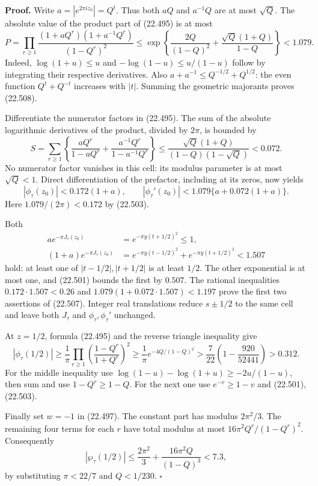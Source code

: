\documentclass[
  11pt,
  a4paper,
]{article}
\begin{document}
\textbf{Proof.} Write \(a=|e^{2\pi iz_0}|=Q^t\). Thus both \(aQ\) and
\(a^{-1}Q\) are at most \(\sqrt Q\). The absolute value of the product
part of (22.495) is at most \[
 P=\prod_{r\ge1}
 \frac{(1+aQ^r)(1+a^{-1}Q^r)}{(1-Q^r)^2}
 \le\exp\left\{\frac{2Q}{(1-Q)^2}
                 +\frac{\sqrt Q(1+Q)}{1-Q}\right\}<1.079.
 \tag{22.508}
\] Indeed, \(\log(1+u)\le u\) and \(-\log(1-u)\le u/(1-u)\) follow by
integrating their respective derivatives. Also
\(a+a^{-1}\le Q^{-1/2}+Q^{1/2}\): the even function \(Q^t+Q^{-t}\)
increases with \(|t|\). Summing the geometric majorants proves (22.508).

Differentiate the numerator factors in (22.495). The sum of the absolute
logarithmic derivatives of the product, divided by \(2\pi\), is bounded
by \[
 S=\sum_{r\ge1}\left\{
  \frac{aQ^r}{1-aQ^r}+\frac{a^{-1}Q^r}{1-a^{-1}Q^r}\right\}
 \le\frac{\sqrt Q(1+Q)}{(1-Q)(1-\sqrt Q)}<0.072.
 \tag{22.509}
\] No numerator factor vanishes in this cell: its modulus parameter is
at most \(\sqrt Q<1\). Direct differentiation of the prefactor,
including at its zeros, now yields \[
 |\phi_\tau(z_0)|<0.172(1+a),\qquad
 |\phi_\tau'(z_0)|<1.079\{a+0.072(1+a)\}.
 \tag{22.510}
\] Here \(1.079/(2\pi)<0.172\) by (22.503).

Both \[
 \begin{split}
 a e^{-\pi J_\tau(z_0)}&=e^{-\pi y(t+1/2)^2}\le1,\\
 (1+a)e^{-\pi J_\tau(z_0)}
 &=e^{-\pi y(t-1/2)^2}+e^{-\pi y(t+1/2)^2}<1.507
 \end{split}
 \tag{22.511}
\] hold: at least one of \(|t-1/2|,|t+1/2|\) is at least \(1/2\). The
other exponential is at most one, and (22.501) bounds the first by
\(0.507\). The rational inequalities \(0.172\cdot1.507<0.26\) and
\(1.079(1+0.072\cdot1.507)<1.197\) prove the first two assertions of
(22.507). Integer real translations reduce \(s\pm1/2\) to the same cell
and leave both \(J_\tau\) and \(\phi_\tau,\phi_\tau'\) unchanged.

At \(z=1/2\), formula (22.495) and the reverse triangle inequality give
\[
 |\phi_\tau(1/2)|\ge\frac1\pi
  \prod_{r\ge1}\left(\frac{1-Q^r}{1+Q^r}\right)^2
 \ge\frac1\pi e^{-4Q/(1-Q)^2}
 >\frac7{22}\left(1-\frac{920}{52441}\right)>0.312.
 \tag{22.512}
\] For the middle inequality use \(\log(1-u)-\log(1+u)\ge-2u/(1-u)\),
then sum and use \(1-Q^r\ge1-Q\). For the next one use \(e^{-v}\ge1-v\)
and (22.501),(22.503).

Finally set \(w=-1\) in (22.497). The constant part has modulus
\(2\pi^2/3\). The remaining four terms for each \(r\) have total modulus
at most \(16\pi^2Q^r/(1-Q^r)^2\). Consequently \[
 |\wp_\tau(1/2)|\le\frac{2\pi^2}{3}
       +\frac{16\pi^2Q}{(1-Q)^3}<7.3,
 \tag{22.513}
\] by substituting \(\pi<22/7\) and \(Q<1/230\). \(\square\)
\end{document}
